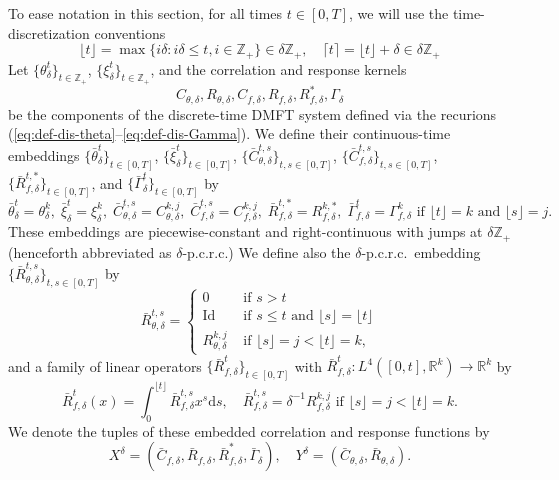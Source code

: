 \documentclass[11pt,letterpaper,reqno]{amsart}
\theoremstyle{definition}
\def\d{\mathrm{d}}
\def\Z{\mathbb{Z}}
\def\R{\mathbb{R}}
\def\Id{\mathrm{Id}}
\newcommand{\flr}[1]{{\lfloor {#1} \rfloor}}
\newcommand{\cil}[1]{{\lceil {#1} \rceil}}
\begin{document}
To ease notation in this section, for all times $t \in [0,T]$,
we will use the time-discretization conventions
\begin{equation}\label{eq:flrcil}
\flr{t} = \max\{i\delta: i\delta\leq t, i\in \Z_+\} \in \delta\Z_+,
\quad \cil{t} = \flr{t} + \delta \in \delta\Z_+
\end{equation}
Let $\{\theta_\delta^t\}_{t \in \Z_+}$, $\{\xi_\delta^t\}_{t \in \Z_+}$,
and the correlation and response kernels
\[C_{\theta,\delta},R_{\theta,\delta},C_{f,\delta},R_{f,\delta},R_{f,\delta}^*,\Gamma_\delta\]
be the components of the discrete-time DMFT system defined via the recurions
(\ref{eq:def-dis-theta}--\ref{eq:def-dis-Gamma}).
We define their continuous-time embeddings
$\{\bar\theta_\delta^t\}_{t \in [0,T]}$, 
$\{\bar \xi_\delta^t\}_{t \in [0,T]}$,
$\{\bar C_{\theta,\delta}^{t,s}\}_{t,s \in [0,T]}$,
$\{\bar C_{f,\delta}^{t,s}\}_{t,s \in [0,T]}$,
$\{\bar R_{f,\delta}^{t,*}\}_{t \in [0,T]}$, and
$\{\bar \Gamma_\delta^t\}_{t \in [0,T]}$ by
\begin{equation}\label{eq:embeddings}
\bar\theta_\delta^t=\theta_\delta^k,
\; \bar\xi_\delta^t=\xi_\delta^k,
\; \bar C_{\theta,\delta}^{t,s}=C_{\theta,\delta}^{k,j},
\; \bar C_{f,\delta}^{t,s}=C_{f,\delta}^{k,j},
\; \bar R_{f,\delta}^{t,*}=R_{f,\delta}^{k,*},
\; \bar \Gamma_{f,\delta}^t=\Gamma_{f,\delta}^k
\text{ if } \flr{t}=k \text{ and } \flr{s}=j.
\end{equation}
These embeddings are piecewise-constant and right-continuous with jumps at
$\delta\Z_+$ (henceforth abbreviated as $\delta$-p.c.r.c.)
We define also the $\delta$-p.c.r.c.\ embedding
$\{\bar R_{\theta,\delta}^{t,s}\}_{t,s \in [0,T]}$ by
\[\bar R_{\theta,\delta}^{t,s}=\begin{cases} 0 & \text{ if } s>t \\
\Id & \text{ if } s \leq t \text{ and } \flr{s}=\flr{t} \\
R_{\theta,\delta}^{k,j} & \text{ if } \flr{s}=j<\flr{t}=k,\end{cases}\]
and a family of linear operators $\{\bar R_{f,\delta}^t\}_{t \in [0,T]}$
with $\bar R_{f,\delta}^t:L^4([0,t],\R^k) \to \R^k$ by
\begin{equation}\label{eq:Rfembed}
\bar R_{f,\delta}^t(x)
=\int_0^{\flr{t}} \bar R_{f,\delta}^{t,s} x^s\d s,
\quad \bar R_{f,\delta}^{t,s}=\delta^{-1}R_{f,\delta}^{k,j} \text{ if }
\flr{s}=j<\flr{t}=k.
\end{equation}
We denote the tuples of these embedded correlation and response functions by
\[X^\delta=(\bar C_{f,\delta},\bar R_{f,\delta},
\bar R_{f,\delta}^*,\bar \Gamma_\delta),
\quad Y^\delta=(\bar C_{\theta,\delta},\bar R_{\theta,\delta}).\]
\end{document}
